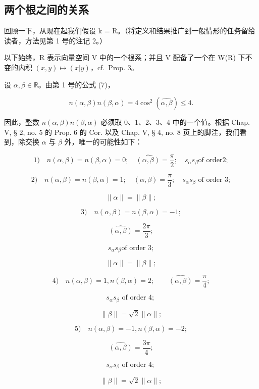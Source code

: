 \subsection{两个根之间的关系}

回顾一下，从现在起我们假设 k = R。（将定义和结果推广到一般情形的任务留给读者，方法见第 1 号的注记 2。）

以下始终，R 表示向量空间 V 中的一个根系；并且 V 配备了一个在 W(R) 下不变的内积 \((x,y)\mapsto(x|y)\)，cf.~Prop. 3。

设 \(\alpha, \beta \in \mathbb{R}\)。由第 1 号的公式 (7)，

\[
n (\alpha , \beta) n (\beta , \alpha) = 4 \cos^ {2} (\widehat {\alpha , \beta}) \leqslant 4.\tag{10}
\]

因此，整数 \(n(\alpha,\beta)n(\beta,\alpha)\) 必须取 0、1、2、3、4 中的一个值。根据 Chap. V, § 2, no. 5 的 Prop. 6 的 Cor. 以及 Chap. V, § 4, no. 8 页上的脚注，我们看到，除交换 \(\alpha\) 与 \(\beta\) 外，唯一的可能性如下：

\[
1) \quad n (\alpha , \beta) = n (\beta , \alpha) = 0; \quad \widehat {(\alpha , \beta)} = \frac {\pi}{2}; \quad s _ {\alpha} s _ {\beta} \text {of order} 2;
\]

\[
2) \quad n (\alpha , \beta) = n (\beta , \alpha) = 1; \quad (\alpha , \beta) = \frac {\pi}{3}; \quad s _ {\alpha} s _ {\beta} \text {   of   order   } 3;
\]

\[
\parallel \alpha \parallel = \parallel \beta \parallel ;
\]

\[
3) \quad n (\alpha , \beta) = n (\beta , \alpha) = - 1;
\]

\[
\widehat {(\alpha , \beta)} = \frac {2 \pi}{3};
\]

\[
s _ {\alpha} s _ {\beta} \text {of order 3};
\]

\[
\| \alpha \| = \| \beta \|;
\]

\[
4) \quad n (\alpha , \beta) = 1, n (\beta , \alpha) = 2; \qquad \widehat {(\alpha , \beta)} = \frac {\pi}{4};
\]

\[
s _ {\alpha} s _ {\beta} \text {   of   order   4;   }
\]

\[
\parallel \beta \parallel = \sqrt {2} \parallel \alpha \parallel ;
\]

\[
5) \quad n (\alpha , \beta) = - 1, n (\beta , \alpha) = - 2;
\]

\[
\widehat {(\alpha , \beta)} = \frac {3 \pi}{4};
\]

\[
s _ {\alpha} s _ {\beta} \text {   of   order   4;   }
\]

\[
\parallel \beta \parallel = \sqrt {2} \parallel \alpha \parallel ;
\]

